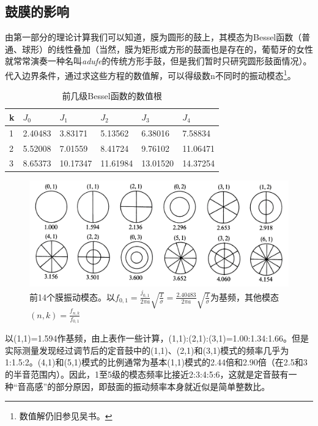 \subsection{鼓膜的影响}
由第一部分的理论计算我们可以知道，膜为圆形的鼓上，其模态为Bessel函数（普通、球形）的线性叠加（当然，膜为矩形或方形的鼓面也是存在的，葡萄牙的女性就常常演奏一种名叫\textit{adufe}的传统方形手鼓，但是我们暂时只研究圆形鼓面情况）。代入边界条件，通过求这些方程的数值解，可以得级数n不同时的振动模态\footnote{数值解仍旧参见吴书。}。
\begin{table}[h]
    \centering
	\label{tab.1}
	\caption{前几级Bessel函数的数值根}
    \begin{tabular}{l|lllll}
    \toprule
        k & $J_0$ & $J_1$ & $J_2$ & $J_3$ & $J_4$\\ \midrule
        1 & 2.40483 & 3.83171 & 5.13562 & 6.38016 & 7.58834\\ \hline
        2 & 5.52008 & 7.01559 & 8.41724 & 9.76102 & 11.06471\\ \hline
        3 & 8.65373 & 10.17347 & 11.61984 & 13.01520 & 14.37254\\ \bottomrule
    \end{tabular}
\end{table}
\begin{figure}[h]
	\centering %
	\includegraphics[width=\textwidth]{pic/pic2} %
	\caption{前14个膜振动模态。以$f_{0,1}=\frac{j_{0,1}}{2\pi a}\sqrt{\frac{T}{\sigma}}=\frac{2.40483}{2\pi a}\sqrt{\frac{T}{\sigma}}$为基频，其他模态$(n,k)=\frac{f_{n,k}}{f_{0,1}}$} %
	\label{fig.2}	%
\end{figure}

以(1,1)=1.594作基频，由上表作一些计算，(1,1):(2,1):(3,1)=1.00:1.34:1.66。但是实际测量发现经过调节后的定音鼓中的(1,1)、(2,1)和(3,1)模式的频率几乎为1:1.5:2。(4,1)和(5,1)模式的比例通常为基本(1,1)模式的2.44倍和2.90倍（在2.5和3的半音范围内）。因此，1至5级的模态频率比接近2:3:4:5:6，这就是定音鼓有一种“音高感”的部分原因，即鼓面的振动频率本身就近似是简单整数比。

